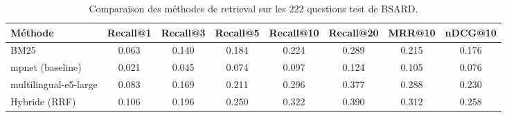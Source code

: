 \begin{table}[t]
\centering
\caption{Comparaison des méthodes de retrieval sur les 222 questions test de BSARD.}
\label{tab:retrieval-comparison}
\begin{tabular}{lccccccc}
\toprule
Méthode & Recall@1 & Recall@3 & Recall@5 & Recall@10 & Recall@20 & MRR@10 & nDCG@10 \\
\midrule
BM25 & 0.063 & 0.140 & 0.184 & 0.224 & 0.289 & 0.215 & 0.176 \\
mpnet (baseline) & 0.021 & 0.045 & 0.074 & 0.097 & 0.124 & 0.105 & 0.076 \\
multilingual-e5-large & 0.083 & 0.169 & 0.211 & 0.296 & 0.377 & 0.288 & 0.230 \\
Hybride (RRF) & 0.106 & 0.196 & 0.250 & 0.322 & 0.390 & 0.312 & 0.258 \\
\bottomrule
\end{tabular}
\end{table}

